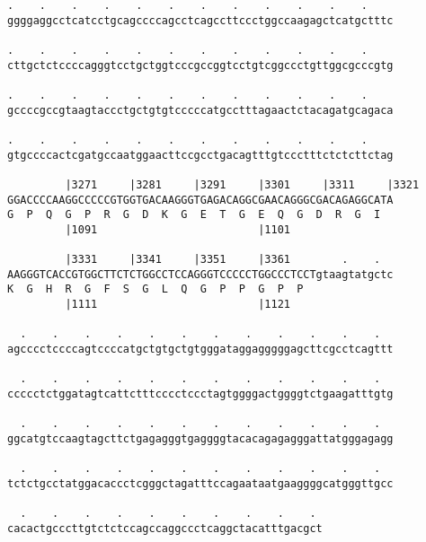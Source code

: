 \documentclass{article}
\begin{document}
\begin{Verbatim}
.    .    .    .    .    .    .    .    .    .    .    .    
ggggaggcctcatcctgcagccccagcctcagccttccctggccaagagctcatgctttc
                                                            
.    .    .    .    .    .    .    .    .    .    .    .    
cttgctctccccagggtcctgctggtcccgccggtcctgtcggccctgttggcgcccgtg
                                                            
.    .    .    .    .    .    .    .    .    .    .    .    
gccccgccgtaagtaccctgctgtgtcccccatgcctttagaactctacagatgcagaca
                                                            
.    .    .    .    .    .    .    .    .    .    .    .    
gtgccccactcgatgccaatggaacttccgcctgacagtttgtccctttctctcttctag
                                                            
         |3271     |3281     |3291     |3301     |3311     |3321
GGACCCCAAGGCCCCCGTGGTGACAAGGGTGAGACAGGCGAACAGGGCGACAGAGGCATA
G  P  Q  G  P  R  G  D  K  G  E  T  G  E  Q  G  D  R  G  I  
         |1091                         |1101                
  
         |3331     |3341     |3351     |3361        .    .  
AAGGGTCACCGTGGCTTCTCTGGCCTCCAGGGTCCCCCTGGCCCTCCTgtaagtatgctc
K  G  H  R  G  F  S  G  L  Q  G  P  P  G  P  P              
         |1111                         |1121                
  
  .    .    .    .    .    .    .    .    .    .    .    .  
agcccctccccagtccccatgctgtgctgtgggataggagggggagcttcgcctcagttt
                                                            
  .    .    .    .    .    .    .    .    .    .    .    .  
ccccctctggatagtcattctttcccctccctagtggggactggggtctgaagatttgtg
                                                            
  .    .    .    .    .    .    .    .    .    .    .    .  
ggcatgtccaagtagcttctgagagggtgaggggtacacagagagggattatgggagagg
                                                            
  .    .    .    .    .    .    .    .    .    .    .    .  
tctctgcctatggacaccctcgggctagatttccagaataatgaaggggcatgggttgcc
                                                            
  .    .    .    .    .    .    .    .    .    . 
cacactgcccttgtctctccagccaggccctcaggctacatttgacgct
                                                 
                                                 
 

\end{Verbatim}
\end{document}
